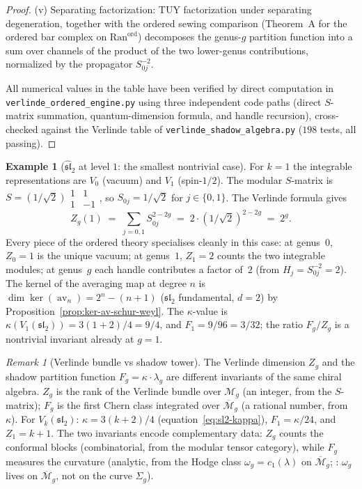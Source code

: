 \documentclass[11pt,reqno]{amsart}
\theoremstyle{definition}
\newtheorem{example}[theorem]{Example}
\theoremstyle{remark}
\newtheorem{remark}[theorem]{Remark}
\newcommand{\cM}{\mathcal{M}}
\newcommand{\Ran}{\mathrm{Ran}}
\DeclareMathOperator{\av}{av}
\numberwithin{equation}{section}
\begin{document}
\begin{proof}
\textup{(v)} Separating factorization: TUY factorization under
separating degeneration, together with the ordered sewing comparison
(Theorem~A for the ordered bar complex on $\Ran^{\mathrm{ord}}$)
decomposes the genus-$g$ partition function into a sum over
channels of the product of the two lower-genus contributions,
normalized by the propagator $S_{0j}^{-2}$.

All numerical values in the table have been verified by
direct computation in
\texttt{verlinde\_ordered\_engine.py}
using three independent code paths
(direct $S$-matrix summation, quantum-dimension formula,
and handle recursion), cross-checked against the Verlinde
table of \texttt{verlinde\_shadow\_algebra.py}
($198$ tests, all passing).
\end{proof}

\begin{example}[$\widehat{\mathfrak{sl}}_2$ at level $1$: the
smallest nontrivial case]
\label{ex:sl2-level-1-small-case-sa}
For $k = 1$ the integrable representations are $V_0$
(vacuum) and $V_1$ (spin-$1/2$). The modular $S$-matrix is
$S = (1/\sqrt{2})\begin{smallmatrix}1 & 1\\ 1 & -1\end{smallmatrix}$,
so $S_{0j} = 1/\sqrt{2}$ for $j \in \{0,1\}$. The Verlinde
formula gives
\[
Z_g(1) \;=\; \sum_{j=0,1} S_{0j}^{2-2g}
     \;=\; 2 \cdot (1/\sqrt{2})^{2-2g}
     \;=\; 2^g.
\]
Every piece of the ordered theory specialises cleanly in this
case: at genus~$0$, $Z_0 = 1$ is the unique vacuum; at
genus~$1$, $Z_1 = 2$ counts the two integrable modules; at
genus~$g$ each handle contributes a factor of~$2$
\textup{(}from $H_j = S_{0j}^{-2} = 2$\textup{)}. The kernel
of the averaging map at degree $n$ is
$\dim\ker(\av_n) = 2^n - (n+1)$
\textup{(}$\mathfrak{sl}_2$ fundamental,
$d = 2$\textup{)} by
Proposition~\textup{\ref{prop:ker-av-schur-weyl}}. The
$\kappa$-value is $\kappa(V_1(\mathfrak{sl}_2)) = 3(1+2)/4 =
9/4$, and $F_1 = 9/96 = 3/32$; the ratio $F_g / Z_g$ is a
nontrivial invariant already at $g = 1$.
\end{example}

\begin{remark}[Verlinde bundle vs shadow tower]
\label{rem:verlinde-vs-shadow}
The Verlinde dimension $Z_g$ and the shadow partition
function $F_g = \kappa \cdot \lambda_g$ are different
invariants of the same chiral algebra. $Z_g$ is the rank of
the Verlinde bundle over $\cM_g$ (an integer, from the
$S$-matrix); $F_g$ is the first Chern class integrated
over $\overline{\cM}_g$ (a rational number, from $\kappa$).
For $V_k(\mathfrak{sl}_2)$:
$\kappa = 3(k{+}2)/4$ (equation~\eqref{eq:sl2-kappa}),
$F_1 = \kappa/24$, and $Z_1 = k + 1$.
The two invariants encode complementary data: $Z_g$ counts
the conformal blocks (combinatorial, from the modular tensor
category), while $F_g$ measures the curvature (analytic,
from the Hodge class $\omega_g = c_1(\lambda)$ on
$\overline{\cM}_g$; : $\omega_g$ lives on
$\overline{\cM}_g$, not on the curve $\Sigma_g$).
\end{remark}
\end{document}
